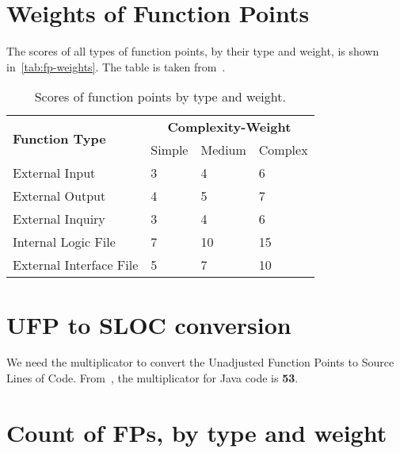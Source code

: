 \section{Weights of Function Points}
The scores of all types of function points, by their type and weight, is shown in~\autoref{tab:fp-weights}. The table is taken from~\cite{cocomo-manual}.
\begin{table}
    \centering
    \begin{tabular}{| l | l | l | l |}
        \hline
        \multirow{2}{*}{\textbf{Function Type}} & \multicolumn{3}{c|}{\textbf{Complexity-Weight}} \\
        \cline{2-4}
        & Simple & Medium & Complex \\
        \hline
        External Input          & 3     & 4     & 6     \\
        External Output         & 4     & 5     & 7     \\
        External Inquiry        & 3     & 4     & 6     \\
        Internal Logic File     & 7     & 10    & 15    \\
        External Interface File & 5     & 7     & 10    \\
        \hline
    \end{tabular}
    \caption{Scores of function points by type and weight.}
    \label{tab:fp-weights}
\end{table}

\section{UFP to SLOC conversion}
We need the multiplicator to convert the Unadjusted Function Points to Source Lines of Code.
From~\cite{cocomo-manual}, the multiplicator for Java code is \textbf{53}.

\section{Count of FPs, by type and weight}

